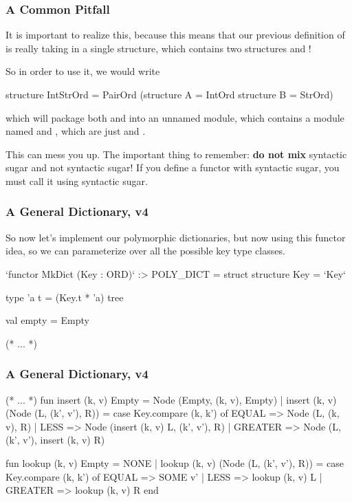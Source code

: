 \documentclass[aspectratio=169]{beamer}
\begin{document}
\begin{frame}[fragile]
  \frametitle{A Common Pitfall}

  It is important to realize this, because this means that our previous definition
  of  is really taking in a single structure, which contains two
  structures  and !

  So in order to use it, we would write
  \begin{codeblock}
    structure IntStrOrd = PairOrd (structure A = IntOrd
                                   structure B = StrOrd)
  \end{codeblock}

  which will package both  and  into an unnamed
  module, which contains a module named  and , which are just
   and .

  This can mess you up. The important thing to remember: \textbf{do not mix}
  syntactic sugar and not syntactic sugar! If you define a functor with syntactic
  sugar, you must call it using syntactic sugar.
\end{frame}

\begin{frame}[fragile]
  \frametitle{A General Dictionary, v4}

  So now let's implement our polymorphic dictionaries, but now using this
  functor idea, so we can parameterize over all the possible key type classes.

  \begin{codeblock}
    `functor MkDict (Key : ORD)` :> POLY_DICT =
      struct
        structure Key = `Key`

        type 'a t = (Key.t * 'a) tree

        val empty = Empty

      (* ... *)
  \end{codeblock}
\end{frame}

\begin{frame}[fragile]
  \frametitle{A General Dictionary, v4}

  {\small
  \begin{codeblock}
    (* ... *)
      fun insert (k, v) Empty = Node (Empty, (k, v), Empty) 
        | insert (k, v) (Node (L, (k', v'), R)) =
            case Key.compare (k, k') of
              EQUAL   => Node (L, (k, v), R)
            | LESS    => Node (insert (k, v) L, (k', v'), R)
            | GREATER => Node (L, (k', v'), insert (k, v) R) 

      fun lookup (k, v) Empty = NONE 
        | lookup (k, v) (Node (L, (k', v'), R)) =
            case Key.compare (k, k') of
              EQUAL   => SOME v' 
            | LESS    => lookup (k, v) L
            | GREATER => lookup (k, v) R
    end
  \end{codeblock}
  }

\end{frame}
\end{document}
